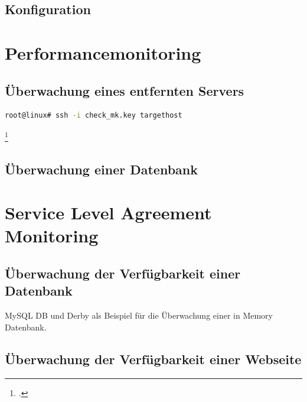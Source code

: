 \documentclass[12pt,a4paper,parskip]{scrreprt}
\begin{document}
	\subsection{Konfiguration}
	\section{Performancemonitoring}
	\subsection{Überwachung eines entfernten Servers}
	\begin{lstlisting}[language=bash]
	root@linux# ssh -i check_mk.key targethost
	\end{lstlisting} \footcite{checkmkCheckBySSH2015}
	\subsection{Überwachung einer Datenbank}
	\section{Service Level Agreement Monitoring}
	\subsection{Überwachung der Verfügbarkeit einer Datenbank}
	MySQL DB und Derby als Beispiel für die Überwachung einer in Memory Datenbank.
	\subsection{Überwachung der Verfügbarkeit einer Webseite}
	\begingroup
	\nocite{*} %
	\printbibliography 
	\endgroup
	\printglossary[title=Abkürzungsverzeichnis, type=\acronymtype] %
	\printglossary[title=Glossar]
	\listoffigures %
	\listoftables %
\end{document}
